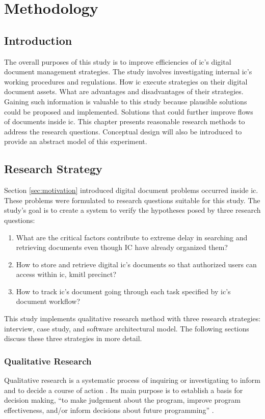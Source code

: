 \chapter{Methodology}
\section{Introduction}
The overall purposes of this study is to improve efficiencies of \gls{ic}'s digital document management strategies. 
The study involves investigating internal \gls{ic}'s working procedures and regulations.
How \gls{ic} execute strategies on their digital document assets.
What are advantages and disadvantages of their strategies.
Gaining such information is valuable to this study because plausible solutions could be proposed and implemented. 
Solutions that could further improve flows of documents inside \gls{ic}.
This chapter presents reasonable research methods to address the research questions.
Conceptual design will also be introduced to provide an abstract model of this experiment.

\section{Research Strategy}
Section \ref{sec:motivation} introduced digital document problems occurred inside \gls{ic}.
These problems were formulated to research questions suitable for this study.
The study's goal is to create a system to verify the hypotheses posed by three research questions:
\begin{enumerate}
	\item What are the critical factors contribute to extreme delay in searching and retrieving documents even though IC have already organized them?
	\item How to store and retrieve digital \gls{ic}'s documents so that authorized users can access within \gls{ic}, \gls{kmitl} precinct?
	\item How to track \gls{ic}'s document going through each task specified by \gls{ic}'s document workflow?
\end{enumerate}
This study implements qualitative research method with three research strategies: interview, case study, and software architectural model.
The following sections discuss these three strategies in more detail.

\subsection{Qualitative Research}
Qualitative research is a systematic process of inquiring or investigating to inform and to decide a course of action \cite{merriam2015qualitative}.
Its main purpose is to establish a basis for decision making, \enquote{to make judgement about the program, improve program effectiveness, and/or inform decisions about future programming} \cite{patton2005qualitative}.

